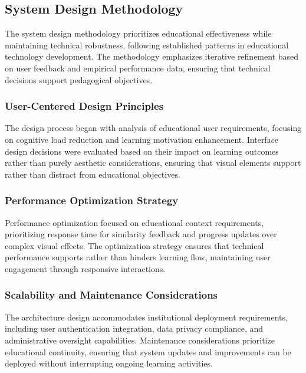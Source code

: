 {\color{maroon}
\subsection{System Design Methodology}

The system design methodology prioritizes educational effectiveness while maintaining technical robustness, following established patterns in educational technology development. The methodology emphasizes iterative refinement based on user feedback and empirical performance data, ensuring that technical decisions support pedagogical objectives.

\subsubsection{User-Centered Design Principles}

The design process began with analysis of educational user requirements, focusing on cognitive load reduction and learning motivation enhancement. Interface design decisions were evaluated based on their impact on learning outcomes rather than purely aesthetic considerations, ensuring that visual elements support rather than distract from educational objectives.

\subsubsection{Performance Optimization Strategy}

Performance optimization focused on educational context requirements, prioritizing response time for similarity feedback and progress updates over complex visual effects. The optimization strategy ensures that technical performance supports rather than hinders learning flow, maintaining user engagement through responsive interactions.

\subsubsection{Scalability and Maintenance Considerations}

The architecture design accommodates institutional deployment requirements, including user authentication integration, data privacy compliance, and administrative oversight capabilities. Maintenance considerations prioritize educational continuity, ensuring that system updates and improvements can be deployed without interrupting ongoing learning activities.
}

